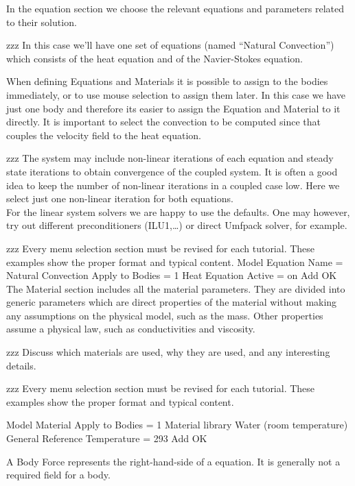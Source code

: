 In the equation section we choose the relevant equations and parameters related to their solution. 

zzz In this case we'll have one set of equations (named ``Natural Convection'') which consists of the heat equation and of the Navier-Stokes equation.

When defining Equations and Materials it is possible to assign to the bodies immediately, or to use mouse selection to assign them later. In this case we have just one body and therefore its easier to assign the Equation and Material to it directly.  It is important to select the convection to be computed since that couples the velocity field to the heat equation.

zzz The system may include non-linear iterations of each equation and steady state iterations to obtain convergence of the coupled system. It is often a good idea to keep the number of non-linear iterations in a coupled case low. Here we select just one non-linear iteration for both equations.\\

For the linear system solvers we are happy to use the defaults. One may however, try out different preconditioners (ILU1,\ldots) or direct Umfpack solver, for example.

zzz Every menu selection section must be revised for each tutorial.  These examples show the proper format and typical content.
\ttbegin
Model
  Equation
   Name = Natural Convection
    Apply to Bodies = 1
    Heat Equation
      Active = on
    Add 
    OK
\ttend        
The Material section includes all the material parameters. They are divided into generic parameters which are direct properties of the material without making any assumptions on the physical model, such as the mass. Other properties assume a physical law, such as conductivities and viscosity. 

zzz Discuss which materials are used, why they are used, and any interesting details.
   
zzz Every menu selection section must be revised for each tutorial.  These examples show the proper format and typical content.

\ttbegin
Model
  Material
    Apply to Bodies = 1 
    Material library    
      Water (room temperature)
    General 
      Reference Temperature = 293
    Add
    OK
\ttend

A Body Force represents the right-hand-side of a equation. It is generally not a required field for a body. 

